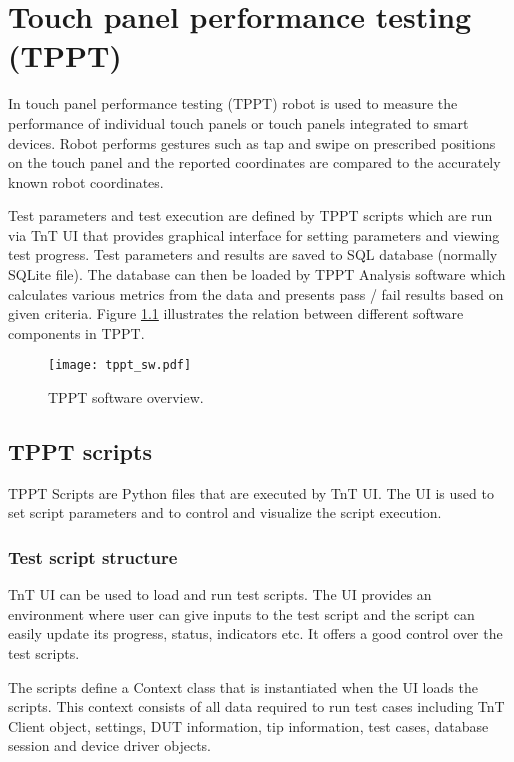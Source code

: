\chapter{Touch panel performance testing (TPPT)}

In touch panel performance testing (TPPT) robot is used to measure the performance of individual touch panels or touch panels integrated to smart devices. Robot performs gestures such as tap and swipe on prescribed positions on the touch panel and the reported coordinates are compared to the accurately known robot coordinates.

Test parameters and test execution are defined by TPPT scripts which are run via TnT UI that provides graphical interface for setting parameters and viewing test progress. Test parameters and results are saved to SQL database (normally SQLite file). The database can then be loaded by TPPT Analysis software which calculates various metrics from the data and presents pass / fail results based on given criteria. Figure \ref{fig:tppt_sw} illustrates the relation between different software components in TPPT.

\begin{figure}[!h]
	\centering
	\texttt{[image: tppt\_sw.pdf]}
	\caption{TPPT software overview.}
	\label{fig:tppt_sw}
\end{figure}

\section{TPPT scripts}

TPPT Scripts are Python files that are executed by TnT UI. The UI is used to set script parameters and to control and visualize the script execution.

\subsection{Test script structure}

TnT UI can be used to load and run test scripts. The UI provides an environment where user can give inputs to the test script and the script can easily update its progress, status, indicators etc. It offers a good control over the test scripts.

The scripts define a Context class that is instantiated when the UI loads the scripts. This context consists of all data required to run test cases including TnT Client object, settings, DUT information, tip information, test cases, database session and device driver objects.

